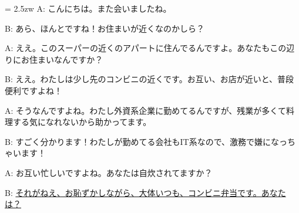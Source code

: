 \documentclass[11pt]{amsart}
\title{}
\author{}
\newenvironment{hangall}[1]{\hangindent = 2.5zw\everypar{\hangindent = 2.5zw}}{}
\begin{document}
\maketitle
\begin{hangall}{}%
A: こんにちは。また会いましたね。

B: あら、ほんとですね！お住まいが近くなのかしら？

A: ええ。このスーパーの近くのアパートに住んでるんですよ。あなたもこの辺りにお住まいなんですか？

B: ええ。わたしは少し先のコンビニの近くです。お互い、お店が近いと、普段便利ですよね！

A: そうなんですよね。わたし外資系企業に勤めてるんですが、残業が多くて料理する気になれないから助かってます。

B: すごく分かります！わたしが勤めてる会社もIT系なので、激務で嫌になっちゃいます！

A: お互い忙しいですよね。あなたは自炊されてますか？

B: \ul{それがねえ、お恥ずかしながら、大体いつも、コンビニ弁当です。あなたは？}\end{hangall}
\end{document}
